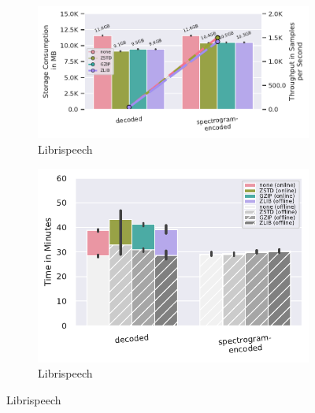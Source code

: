 \documentclass[sigconf,nonacm]{acmart}
\begin{document}
\begin{figure}[b]
  \begin{subfigure}{0.49 \columnwidth}
    \includegraphics[width=\linewidth]{../images/librispeech-pipeline/compressed-storage-vs-throughput.pdf}
    \caption{Librispeech}
    \Description{}
    \label{fig:zstd-librispeech-compressed-storage-vs-throughput}
  \end{subfigure}
  \hfill %
  \begin{subfigure}{0.49 \columnwidth}
    \includegraphics[width=\linewidth]{../images/librispeech-pipeline/compression-processing-time-split.pdf}
    \caption{Librispeech}
    \Description{}
    \label{fig:zstd-librispeech-compression-processing-time-split}
  \end{subfigure}
  

\end{figure}
\end{document}
